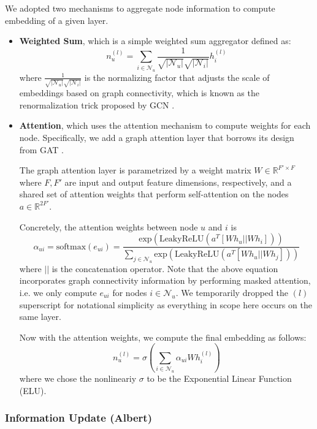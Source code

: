 \documentclass{article}
\begin{document}
We adopted two mechanisms to aggregate node information to compute embedding of a given layer. 
\begin{itemize}
    \item \textbf{Weighted Sum}, which is a simple weighted sum aggregator defined as: $$n_u^{(l)}=\sum_{i\in \mathcal{N}_u} \frac{1}{\sqrt{|\mathcal{N}_u|} \sqrt{|\mathcal{N}_i|}} h_i^{(l)}$$
    where $\frac{1}{\sqrt{|\mathcal{N}_u|} \sqrt{|\mathcal{N}_i|}}$ is the normalizing factor that adjusts the scale of embeddings based on graph connectivity, which is known as the renormalization trick proposed by GCN \cite{gcn}.

    \item \textbf{Attention}, which uses the attention mechanism to compute weights for each node. Specifically, we add a graph attention layer that borrows its design from GAT \cite{gat}. 
    
    The graph attention layer is parametrized by a weight matrix $W \in \mathbb{R}^{F' \times F}$ where $F, F'$ are input and output feature dimensions, respectively, and a shared set of attention weights that perform self-attention on the nodes $a \in \mathbb{R}^{2F'}$. 

    Concretely, the attention weights between node $u$ and $i$ is $$\alpha_{ui} = \text{softmax} (e_{ui}) = \frac{\text{exp}(\text{LeakyReLU} (a^T [Wh_u || Wh_i]) )}{\sum_{j\in \mathcal{N}_u}  \text{exp}(\text{LeakyReLU} (a^T [Wh_u || Wh_j]) )}$$
    where $||$ is the concatenation operator. Note that the above equation incorporates graph connectivity information by performing masked attention, i.e. we only compute $e_{ui}$ for nodes $i\in \mathcal{N}_u$. We temporarily dropped the ${(l)}$ superscript for notational simplicity as everything in scope here occurs on the same layer.

    Now with the attention weights, we compute the final embedding as follows: $$n_u^{(l)} = \sigma ( \sum_{i\in \mathcal{N}_u} \alpha_{ui} W h_i^{(l)}  )$$ where we chose the nonlineariy $\sigma$ to be the Exponential Linear Function (ELU).
\end{itemize}

\subsubsection{Information Update (Albert)}
\end{document}

